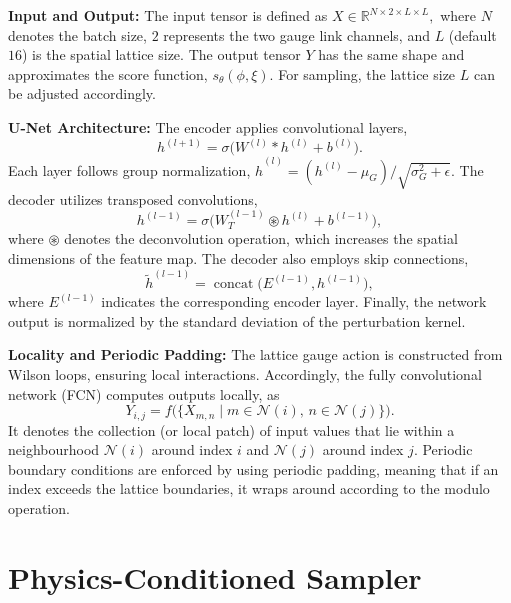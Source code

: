 \documentclass[a4paper,11pt]{article}
\newcommand{\el}{\vspace*{0.2cm}}
\begin{document}
\noindent\textbf{Input and Output:}
The input tensor is defined as $ X \in \mathbb{R}^{N\times2\times L\times L},$ where $N$ denotes the batch size, $2$ represents the two gauge link channels, and $L$ (default $16$) is the spatial lattice size. The output tensor $Y$ has the same shape and approximates the score function, $ s_{\theta}(\phi, \xi).$ For sampling, the lattice size $L$ can be adjusted accordingly.

\el\noindent
\textbf{U-Net Architecture:}
The encoder applies convolutional layers,
\begin{equation}
h^{(l+1)}=\sigma\Big(W^{(l)}*h^{(l)}+b^{(l)}\Big).
\end{equation}
Each layer follows group normalization, $\hat{h}^{(l)}= {(h^{(l)}-\mu_G)}/{\sqrt{\sigma_G^2+\epsilon}}.$ The decoder utilizes transposed convolutions,
\begin{equation}
h^{(l-1)}=\sigma\Big(W^{(l-1)}_T\circledast h^{(l)}+b^{(l-1)}\Big),
\end{equation}
where $\circledast$ denotes the deconvolution operation, which increases the spatial dimensions of the feature map. The decoder also employs skip connections,
\begin{equation}
\tilde{h}^{(l-1)} = \operatorname{concat}\big(E^{(l-1)}, h^{(l-1)}\big),
\end{equation}
where $E^{(l-1)}$ indicates the corresponding encoder layer. Finally, the network output is normalized by the standard deviation of the perturbation kernel.

\el\noindent
\textbf{Locality and Periodic Padding:}
The lattice gauge action is constructed from Wilson loops, ensuring local interactions. Accordingly, the fully convolutional network (FCN) computes outputs locally, as 
\begin{equation}
Y_{i,j} = f\Big( \{X_{m,n} \mid m \in \mathcal{N}(i),\, n \in \mathcal{N}(j) \} \Big).
\end{equation}
It denotes the collection (or local patch) of input values that lie within a neighbourhood $\mathcal{N}(i)$ around index $i$ and $\mathcal{N}(j)$ around index $j$. Periodic boundary conditions are enforced by using periodic padding, meaning that if an index exceeds the lattice boundaries, it wraps around according to the modulo operation.





\section{Physics-Conditioned Sampler}
\label{sec:physics_conditioned_sampler}
\end{document}

